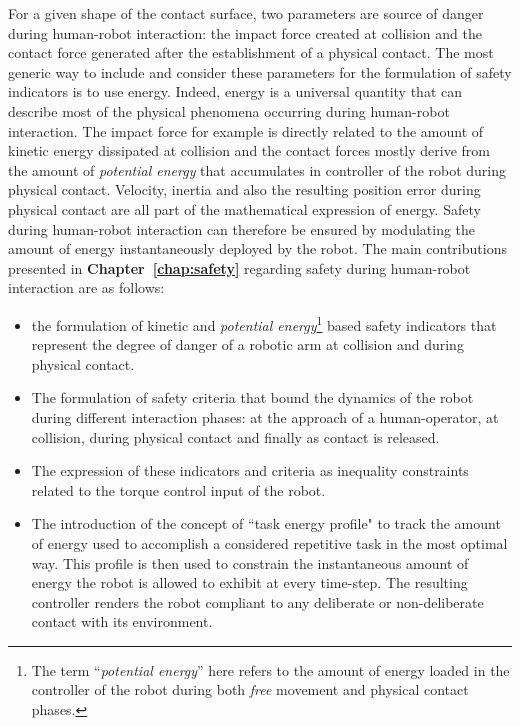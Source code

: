 For a given shape of the contact surface, two parameters are source of danger during human-robot interaction: the impact force created at collision and the contact force generated after the establishment of a physical contact. The most generic way to include and consider these parameters for the formulation of  safety indicators is to use energy. Indeed, energy is a universal quantity that can describe most of the physical phenomena occurring during human-robot interaction. The impact force for example is directly related to the amount of kinetic energy dissipated at collision and the contact forces mostly derive from the amount of \textit{potential energy} that accumulates in controller of the robot during physical contact. Velocity, inertia and also the resulting position error during physical contact are all part of the mathematical expression of energy. 
Safety during human-robot interaction can therefore be ensured by modulating the amount of energy instantaneously deployed by the robot. The main contributions presented in \textbf{Chapter~\ref{chap:safety}} regarding safety during human-robot interaction are as follows:
\begin{itemize}
\item the formulation of kinetic and \textit{potential energy}\footnote{The term ``\textit{potential energy}'' here refers to the amount of energy loaded in the controller of the robot during both \textit{free} movement and physical contact phases.} based safety indicators that represent the degree of danger of a robotic arm at collision and during physical contact.
\item The formulation of safety criteria that bound the dynamics of the robot during different interaction phases: at the approach of a human-operator, at collision, during physical contact and finally as contact is released.
\item The expression of these indicators and criteria as inequality constraints related to the torque control input of the robot.
\item The introduction of the concept of ``task energy profile" to track the amount of energy used to accomplish a considered repetitive task in the most optimal way. This profile is then used to constrain the instantaneous amount of energy the robot is allowed to exhibit at every time-step.
The resulting controller renders the robot compliant to any deliberate or non-deliberate contact with its environment.
\end{itemize}
